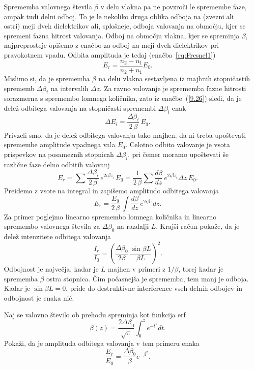 Sprememba valovnega števila $\beta$ v delu vlakna pa ne povzroči le spremembe faze, 
ampak tudi delni odboj.
To je le nekoliko druga oblika odboja na (zvezni ali ostri) meji 
dveh dielektrikov ali, splošneje, odboja valovanja na območju,
kjer se spremeni fazna hitrost valovanja.
Odboj na območju vlakna, kjer se spreminja $\beta$, najpreprosteje opišemo 
z enačbo za odboj na meji dveh dielektrikov pri pravokotnem
vpadu. Odbita amplituda je tedaj (enačba~\ref{eq:Fresnel1})
\begin{equation}
E_{r}=\frac{n_{2}-n_{1}}{n_{2}+n_{1}}E_{0}.
\label{9.26}
\end{equation}
Mislimo si, da je sprememba $\beta$ na delu vlakna sestavljena iz
majhnih stopničastih sprememb $\Delta\beta_{i}$ na intervalih $\Delta z$.
Za ravno valovanje je sprememba fazne hitrosti sorazmerna s spremembo
lomnega količnika, zato iz enačbe~(\ref{9.26}) sledi, da je delež odbitega
valovanja na stopničasti spremembi $\Delta\beta_{i}$ enak
\begin{equation}
\Delta E_{i}=\frac{\Delta\beta_{i}}{2\,\beta}\, E_{0}.
\label{9.27}
\end{equation}
Privzeli smo, da je delež odbitega valovanja tako majhen, da ni treba upoštevati 
spremembe amplitude vpadnega vala $E_{0}$. Celotno odbito valovanje je vsota 
prispevkov na posameznih stopnicah $\Delta\beta_{i}$,
pri čemer moramo upoštevati še različne faze delno odbitih valovanj
\begin{equation}
E_{r}=\sum\frac{\Delta\beta_{i}}{2\,\beta}\, e^{2i\beta z_{i}}\, 
E_{0}=\frac{1}{2\,\beta}\sum\frac{d\beta}{dz}\, e^{2i\beta z_{i}}\Delta z\, E_{0}.
\label{9.28}
\end{equation}
Preidemo z vsote na integral in zapišemo amplitudo odbitega valovanja
\begin{equation}
E_{r}=\frac{E_{0}}{2\,\beta}\,\int\frac{d\beta}{dz}\, e^{2i\beta z}dz.
\label{9.29}
\end{equation}
Za primer poglejmo linearno spremembo lomnega količnika in linearno spremembo 
valovnega števila za $\Delta\beta_{0}$ na razdalji $L$. Krajši račun pokaže, da je 
delež intenzitete odbitega valovanja 
\begin{equation}
\frac{I_{r}}{I_{0}}=\left( \frac{\Delta\beta_{0}}{2 \beta}\,\frac{\sin\beta L}{\beta L}\right)^2.
\label{9.30}
\end{equation}
Odbojnost je največja, kadar je $L$ majhen v primeri z $1/\beta$,
torej kadar je sprememba $\beta$ ostra stopnica. Čim počasnejša je
sprememba, tem manj je odboja. Kadar je $\sin\beta L=0$, pride do destruktivne 
interference vseh delnih odbojev in odbojnost je enaka nič.

\begin{definition}
Naj se valovno število ob prehodu spreminja kot funkcija erf
\begin{equation}
\beta (z)= \frac{2\Delta \beta_0}{\sqrt{\pi}} \int_0^z e^{-t^2}dt.
\end{equation}
Pokaži, da je amplituda odbitega valovanja v tem primeru enaka
\begin{equation}
\frac{E_r}{E_0} = \frac{\Delta \beta_0}{\beta}e^{-\beta^2}.
\end{equation}
\end{definition}
